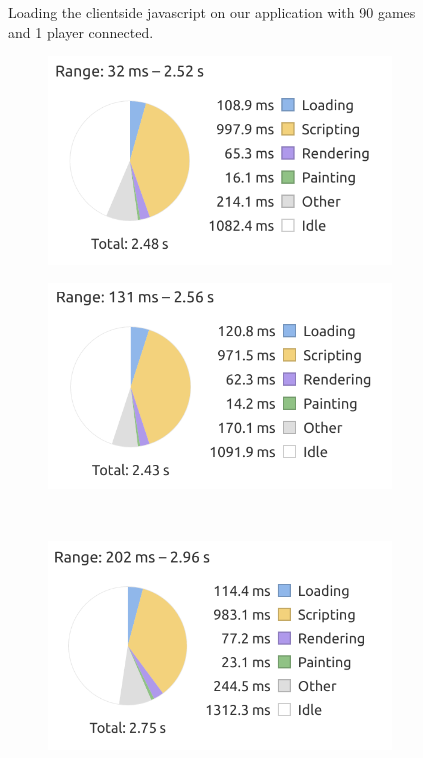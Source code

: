 \begin{figure}[H]
    \caption{Loading the clientside javascript on our application with 90 games and 1 player connected.}
\end{figure}

\begin{figure}[H]
    \centering
    \begin{subfigure}{0.49\textwidth}
        \includegraphics[width=\textwidth]{figure/clientsidePerformance/braseegraph1.png}
    \end{subfigure}
    \begin{subfigure}{0.49\textwidth}
        \includegraphics[width=\textwidth]{figure/clientsidePerformance/braseegraph2.png}
    \end{subfigure}
    \\
    \begin{subfigure}{0.5\textwidth}
        \includegraphics[width=\textwidth]{figure/clientsidePerformance/braseegraph3.png}

\end{subfigure}
\end{figure}
